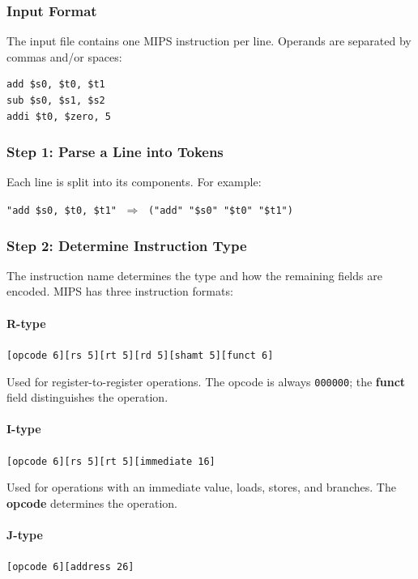 \subsubsection{Input Format}

The input file contains one MIPS instruction per line.
Operands are separated by commas and/or spaces:

\begin{lstlisting}
add $s0, $t0, $t1
sub $s0, $s1, $s2
addi $t0, $zero, 5
\end{lstlisting}

\subsubsection{Step 1: Parse a Line into Tokens}

Each line is split into its components. For example:

\begin{center}
\texttt{"add \$s0, \$t0, \$t1"} $\;\Rightarrow\;$
\texttt{("add" "\$s0" "\$t0" "\$t1")}
\end{center}

\subsubsection{Step 2: Determine Instruction Type}

The instruction name determines the type and how the remaining
fields are encoded. MIPS has three instruction formats:

\paragraph{R-type} \texttt{[opcode 6][rs 5][rt 5][rd 5][shamt 5][funct 6]}

Used for register-to-register operations.
The opcode is always \texttt{000000}; the \textbf{funct} field
distinguishes the operation.

\paragraph{I-type} \texttt{[opcode 6][rs 5][rt 5][immediate 16]}

Used for operations with an immediate value, loads, stores, and
branches. The \textbf{opcode} determines the operation.

\paragraph{J-type} \texttt{[opcode 6][address 26]}

